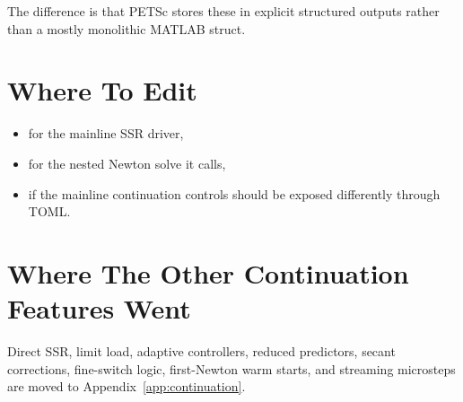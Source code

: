 The difference is that PETSc stores these in explicit structured outputs rather
than a mostly monolithic MATLAB struct.

\section{Where To Edit}

\begin{itemize}
\item {} for the mainline SSR driver,
\item {} for the nested Newton solve it calls,
\item {} if the mainline continuation controls
should be exposed differently through TOML.
\end{itemize}

\section{Where The Other Continuation Features Went}

Direct SSR, limit load, adaptive controllers, reduced predictors, secant
corrections, fine-switch logic, first-Newton warm starts, and streaming
microsteps are moved to Appendix~\ref{app:continuation}.
